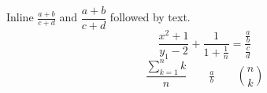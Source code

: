 \documentclass[12pt,letterpaper]{article}
\begin{document}
Inline $\frac{a+b}{c+d}$ and $\dfrac{a+b}{c+d}$ followed by text.
\[
 \frac{x^2+1}{y_1-2} + \frac{1}{1+\frac{1}{n}} = \dfrac{\frac{a}{b}}{\frac{c}{d}}
\]
\[
 \frac{\sum_{k=1}^{n} k}{n} \qquad \tfrac{a}{b} \qquad \binom{n}{k}
\]
\end{document}

